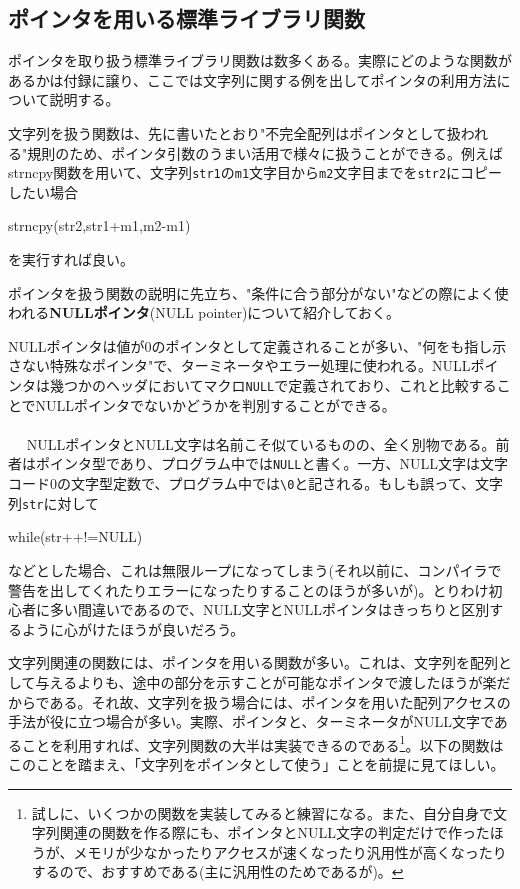 \subsection{ポインタを用いる標準ライブラリ関数}
ポインタを取り扱う標準ライブラリ関数は数多くある。実際にどのような関数があるかは付録に譲り、ここでは文字列に関する例を出してポインタの利用方法について説明する。

文字列を扱う関数は、先に書いたとおり"不完全配列はポインタとして扱われる"規則のため、ポインタ引数のうまい活用で様々に扱うことができる。例えばstrncpy関数を用いて、文字列\verb|str1|の\verb|m1|文字目から\verb|m2|文字目までを\verb|str2|にコピーしたい場合
\begin{code}
strncpy(str2,str1+m1,m2-m1)
\end{code}
を実行すれば良い。

ポインタを扱う関数の説明に先立ち、"条件に合う部分がない"などの際によく使われる\textbf{NULLポインタ}(NULL pointer)について紹介しておく。

NULLポインタは値が0のポインタとして定義されることが多い、"何をも指し示さない特殊なポインタ"で、ターミネータやエラー処理に使われる。NULLポインタは幾つかのヘッダにおいてマクロ\verb|NULL|で定義されており、これと比較することでNULLポインタでないかどうかを判別することができる。
\\ \\　
NULLポインタとNULL文字は名前こそ似ているものの、全く別物である。前者はポインタ型であり、プログラム中では\verb|NULL|と書く。一方、NULL文字は文字コード0の文字型定数で、プログラム中では\verb|\0|と記される。もしも誤って、文字列\verb|str|に対して
\begin{code}
while(str++!=NULL)
\end{code}
などとした場合、これは無限ループになってしまう(それ以前に、コンパイラで警告を出してくれたりエラーになったりすることのほうが多いが)。とりわけ初心者に多い間違いであるので、NULL文字とNULLポインタはきっちりと区別するように心がけたほうが良いだろう。

文字列関連の関数には、ポインタを用いる関数が多い。これは、文字列を配列として与えるよりも、途中の部分を示すことが可能なポインタで渡したほうが楽だからである。それ故、文字列を扱う場合には、ポインタを用いた配列アクセスの手法が役に立つ場合が多い。実際、ポインタと、ターミネータがNULL文字であることを利用すれば、文字列関数の大半は実装できるのである\footnote{試しに、いくつかの関数を実装してみると練習になる。また、自分自身で文字列関連の関数を作る際にも、ポインタとNULL文字の判定だけで作ったほうが、メモリが少なかったりアクセスが速くなったり汎用性が高くなったりするので、おすすめである(主に汎用性のためであるが)。}。以下の関数はこのことを踏まえ、「文字列をポインタとして使う」ことを前提に見てほしい。

